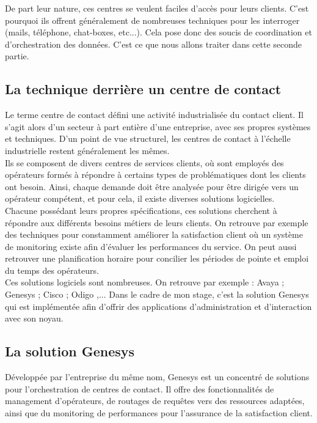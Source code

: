 \documentclass{rapport}
\begin{document}
De part leur nature, ces centres se veulent faciles d'accès pour leurs clients. C'est pourquoi ils offrent généralement de nombreuses techniques pour les interroger (mails, téléphone, chat-boxes, etc...). Cela pose donc des soucis de coordination et d'orchestration des données.
C'est ce que nous allons traiter dans cette seconde partie.

\subsection{La technique derrière un centre de contact}

Le terme centre de contact défini une activité industrialisée du contact client. Il s'agit alors d'un secteur à part entière d'une entreprise, avec ses propres systèmes et techniques.
D'un point de vue structurel, les centres de contact à l'échelle industrielle restent généralement les mêmes.\\

Ils se composent de divers centres de services clients, où sont employés des opérateurs formés à répondre à certains types de problématiques dont les clients ont besoin. Ainsi, chaque demande doit être analysée pour être dirigée vers un opérateur compétent, et pour cela, il existe diverses solutions logicielles.\\

Chacune possédant leurs propres spécifications, ces solutions cherchent à répondre aux différents besoins métiers de leurs clients.
On retrouve par exemple des techniques pour constamment améliorer la satisfaction client où un système de monitoring existe afin d'évaluer les performances du service. On peut aussi retrouver une planification horaire pour concilier les périodes de pointe et emploi du temps des opérateurs.\\

Ces solutions logiciels sont nombreuses. On retrouve par exemple :
Avaya ; Genesys ; Cisco ; Odigo ,...
Dans le cadre de mon stage, c'est la solution Genesys qui est implémentée afin d'offrir des applications d'administration et d'interaction avec son noyau.

\subsection{La solution Genesys}

Développée par l'entreprise du même nom, Genesys est un concentré de solutions pour l'orchestration de centres de contact. Il offre des fonctionnalités de management d'opérateurs, de routages de requêtes vers des ressources adaptées, ainsi que du monitoring de performances pour l'assurance de la satisfaction client.\\
\end{document}
